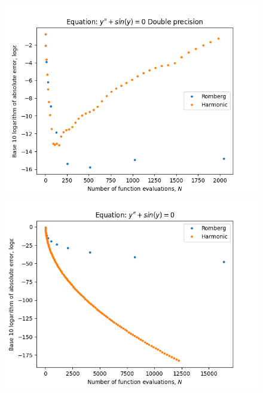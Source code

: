 \begin{figure}[H]
\centering
\begin{minipage}{0.45\textwidth}
\centering
\includegraphics[scale=0.45]{../results/emr_plots/oscillation.png}
\end{minipage}
\begin{minipage}{0.45\textwidth}
\centering
\includegraphics[scale=0.45]{../results/emr_plots/oscillation_hp.png}
\end{minipage}
\end{figure}

